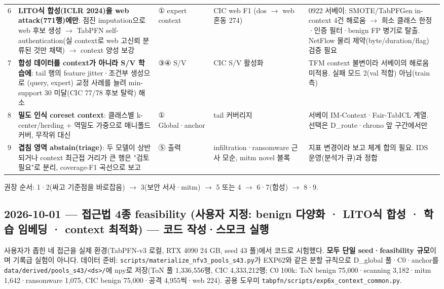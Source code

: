 \begin{longtable}
{}6 & \textbf{LITO식 합성(ICLR 2024)을 web attack(771행)에만}: 점진 imputation으로 web 후보 생성  \ensuremath{\rightarrow}  TabPFN self-authentication(실 context로 web 고신뢰 분류된 것만 채택)  \ensuremath{\rightarrow}  context 양성 보강 & ① expert context & CIC web F1 (dos \ensuremath{\rightarrow} web 혼동 274) & 0922 서베이: SMOTE/\allowbreak{}TabPFGen in-context 4건 해로움  \ensuremath{\rightarrow}  희소 클래스 한정·인증 필터·benign FP 병기로 탈출. NetFlow 물리 제약(byte/\allowbreak{}duration/\allowbreak{}flag) 검증 필요 \\
{}7 & \textbf{합성 데이터를 context가 아니라 S/\allowbreak{}V 학습에}: tail 행의 feature jitter·조건부 생성으로 (query, expert) 교정 사례를 늘려 min-support 30 미달(CIC 77/\allowbreak{}78 후보 탈락) 해소 & ③④ S/\allowbreak{}V & CIC S/\allowbreak{}V 활성화 & TFM context 불변이라 서베이의 해로움 미적용. 실패 모드 2(val 적합) 아님(train측) \\
{}8 & \textbf{밀도 인식 coreset context}: 클래스별 k-center/\allowbreak{}herding +\allowbreak{} 역밀도 가중으로 매니폴드 커버, 무작위 대신 & ① Global·anchor & tail 커버리지 & 서베이 IM-Context·Fair-TabICL 계열. 선택은 D\_\allowbreak{}route·chrono 앞 구간에서만 \\
{}9 & \textbf{겹침 영역 abstain(triage)}: 두 모델이 상반되거나 context 최근접 거리가 큰 행은 "검토 필요"로 분리, coverage-F1 곡선으로 보고 & ⑤ 출력 & infiltration·ransomware 근사 모순, mitm novel 블록 & 지표 변경이라 보고 체계 합의 필요. IDS 운영(분석가 큐)과 정합 \\
\bottomrule
\end{longtable}
\endgroup
권장 순서: 1·2(싸고 기준점을 바로잡음)  \ensuremath{\rightarrow}  3(보안 서사·mitm)  \ensuremath{\rightarrow}  5 또는 4  \ensuremath{\rightarrow}  6·7(합성)  \ensuremath{\rightarrow}  8·9.

\subsection{2026-10-01 — 접근법 4종 feasibility (사용자 지정: benign 다양화 · LITO식 합성 · 학습 임베딩 · context 최적화) — 코드 작성·스모크 실행}
사용자가 좁힌 네 접근을 실제 환경(TabPFN-v3 로컬, RTX 4090 24 GB, seed 43 풀)에서 코드로 시험했다. \textbf{모두 단일 seed·feasibility 규모}이며 기록급 실험이 아니다. 데이터 준비: \texttt{scripts/\allowbreak{}\allowbreak{}material\allowbreak{}ize\_\allowbreak{}\allowbreak{}nfv3\allowbreak{}\_\allowbreak{}\allowbreak{}pools\_\allowbreak{}\allowbreak{}s\allowbreak{}43.\allowbreak{}py}가 EXP62와 같은 분할 규칙으로 D\_\allowbreak{}global 풀·C0·anchor를 \texttt{data/\allowbreak{}\allowbreak{}der\allowbreak{}ived/\allowbreak{}\allowbreak{}poo\allowbreak{}ls\_\allowbreak{}\allowbreak{}s43/\allowbreak{}\allowbreak{}<\allowbreak{}ds>/\allowbreak{}\allowbreak{}}에 npy로 저장(ToN 풀 1,336,556행, CIC 4,333,212행; C0 100k: ToN benign 75,000·scanning 3,182·mitm 1,642·ransomware 1,075, CIC benign 75,000·공격 4,955씩·web 224). 공용 도우미 \texttt{tabpfn/\allowbreak{}\allowbreak{}s\allowbreak{}cripts/\allowbreak{}\allowbreak{}e\allowbreak{}xp6x\_\allowbreak{}\allowbreak{}con\allowbreak{}text\_\allowbreak{}\allowbreak{}com\allowbreak{}mon.\allowbreak{}py}.

